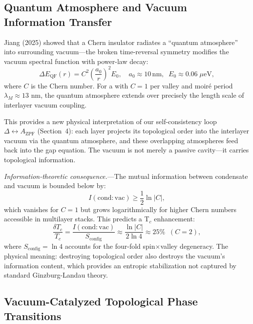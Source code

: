 \documentclass[11pt,letterpaper]{article}
\begin{document}
\subsection{Quantum Atmosphere and Vacuum Information Transfer}
\label{sec:quantum_atmosphere}

Jiang (2025)\cite{Jiang2025} showed that a Chern insulator radiates a ``quantum atmosphere'' into surrounding vacuum---the broken time-reversal symmetry modifies the vacuum spectral function with power-law decay:
\begin{equation}
\Delta E_{\text{QF}}(r) = C^2 \left(\frac{a_0}{r}\right)^2 E_0, \quad a_0 \approx 10\,\text{nm}, \;\; E_0 \approx 0.06\;\mu\text{eV},
\end{equation}
where $C$ is the Chern number. For a \TEVC{} with $C = 1$ per valley and moiré period $\lambda_M \approx 13$ nm, the quantum atmosphere extends over precisely the length scale of interlayer vacuum coupling.

This provides a new physical interpretation of our self-consistency loop $\Delta \leftrightarrow A_{\text{ZPF}}$ (Section~4): each \TEVC{} layer projects its topological order into the interlayer vacuum via the quantum atmosphere, and these overlapping atmospheres feed back into the gap equation. The vacuum is not merely a passive cavity---it carries topological information.

\textit{Information-theoretic consequence.}---The mutual information between condensate and vacuum is bounded below by:
\begin{equation}
I(\text{cond}:\text{vac}) \geq \frac{1}{2}\ln|C|,
\end{equation}
which vanishes for $C = 1$ but grows logarithmically for higher Chern numbers accessible in multilayer stacks. This predicts a T$_c$ enhancement:
\begin{equation}
\frac{\delta T_c}{T_c} = \frac{I(\text{cond}:\text{vac})}{S_{\text{config}}} \approx \frac{\ln|C|}{2\ln 4} \approx 25\% \;\; (C = 2),
\end{equation}
where $S_{\text{config}} = \ln 4$ accounts for the four-fold spin$\times$valley degeneracy. The physical meaning: destroying topological order also destroys the vacuum's information content, which provides an entropic stabilization not captured by standard Ginzburg-Landau theory.

\subsection{Vacuum-Catalyzed Topological Phase Transitions}
\label{sec:topo_transitions}
\end{document}
